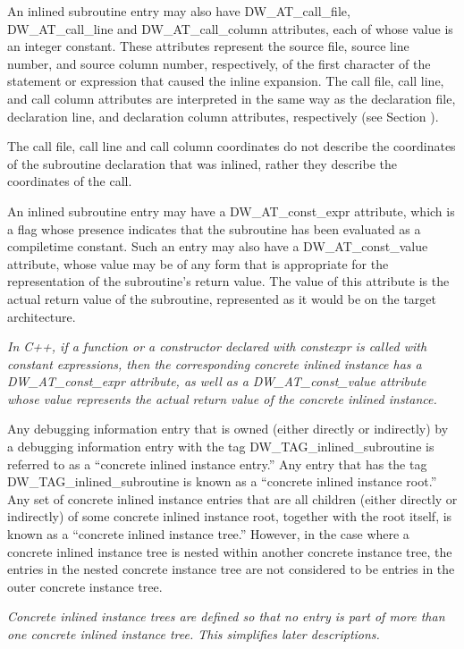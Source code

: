 An inlined subroutine entry may also have DW\-\_AT\-\_call\-\_file,
DW\-\_AT\-\_call\-\_line and DW\-\_AT\-\_call\-\_column attributes, 
each of whose
value is an integer constant. These attributes represent the
source file, source line number, and source column number,
respectively, of the first character of the statement or
expression that caused the inline expansion. The call file,
call line, and call column attributes are interpreted in
the same way as the declaration file, declaration line, and
declaration column attributes, respectively (see 
Section ).

The call file, call line and call column coordinates do not
describe the coordinates of the subroutine declaration that
was inlined, rather they describe the coordinates of the call.

An inlined subroutine entry may have a DW\_AT\_const\_expr
attribute, which is a flag whose presence indicates that the
subroutine has been evaluated as a compile\dash time constant. Such
an entry may also have a DW\_AT\_const\_value attribute,
whose value may be of any form that is appropriate for the
representation of the subroutine's return value. The value of
this attribute is the actual return value of the subroutine,
represented as it would be on the target architecture.

\textit{In C++, if a function or a constructor declared with constexpr
is called with constant expressions, then the corresponding
concrete inlined instance has a DW\_AT\_const\_expr attribute,
as well as a DW\_AT\_const\_value attribute whose value represents
the actual return value of the concrete inlined instance.}

Any debugging information entry that is owned (either
directly or indirectly) by a debugging information entry
with the tag DW\_TAG\_inlined\_subroutine is referred to as a
“concrete inlined instance entry.” Any entry that has
the tag DW\_TAG\_inlined\_subroutine is known as a “concrete
inlined instance root.” Any set of concrete inlined instance
entries that are all children (either directly or indirectly)
of some concrete inlined instance root, together with the root
itself, is known as a ``concrete inlined instance tree.''
However, in the case where a concrete inlined instance tree
is nested within another concrete instance tree, the entries
in the nested concrete instance tree are not considered to
be entries in the outer concrete instance tree.

\textit{Concrete inlined instance trees are defined so that no entry
is part of more than one concrete inlined instance tree. This
simplifies later descriptions.}

